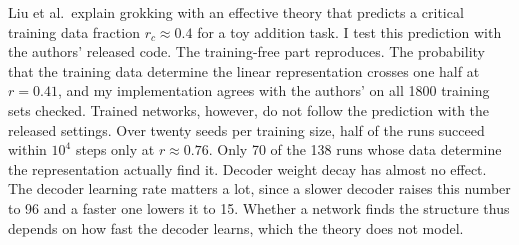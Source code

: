 Liu et al.\ explain grokking with an effective theory that predicts a critical
training data fraction $r_c \approx 0.4$ for a toy addition task. I test this prediction with the authors' released code. The training-free part reproduces. The probability that the training data determine the
linear representation crosses one half at $r = 0.41$, and my implementation agrees with the authors' on all 1800 training sets checked. Trained networks,
however, do not follow the prediction with the released settings. Over twenty
seeds per training size, half of the runs succeed within $10^4$ steps only at
$r \approx 0.76$. Only 70 of the 138 runs whose data determine the representation actually find it.
Decoder weight decay has almost no effect. The decoder learning rate matters
a lot, since a slower decoder raises this number to 96 and a faster one
lowers it to 15. Whether a network finds the structure thus depends on how
fast the decoder learns, which the theory does not model.
